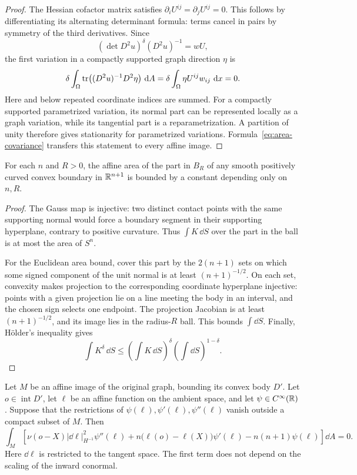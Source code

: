 \begin{proof}
The Hessian cofactor matrix satisfies
\(\partial_iU^{ij}=\partial_jU^{ij}=0\). This follows by differentiating
its alternating determinant formula: terms cancel in pairs by symmetry
of the third derivatives. Since
\[
 (\det D^2u)^\delta(D^2u)^{-1}=wU,
\]
the first variation in a compactly supported graph direction \(\eta\)
is
\[
 \delta\int_\Omega
 \operatorname{tr}\bigl((D^2u)^{-1}D^2\eta\bigr)\,\mathop{}\!\mathrm d A
 =\delta\int_\Omega \eta U^{ij}w_{ij}\,\mathop{}\!\mathrm d x=0.
\]
Here and below repeated coordinate indices are summed. For a compactly
supported parametrized variation, its normal part can be represented
locally as a graph variation, while its tangential part is a
reparametrization. A partition of unity therefore gives stationarity
for parametrized variations. Formula~\eqref{eq:area-covariance}
transfers this statement to every affine image.
\end{proof}

\begin{lemma}\label{lem:area-bound}
For each \(n\) and \(R>0\), the affine area of the part in \(B_R\) of
any smooth positively curved convex boundary in \(\mathbb R^{n+1}\) is bounded
by a constant depending only on \(n,R\).
\end{lemma}

\begin{proof}
The Gauss map is injective: two distinct contact points with the same
supporting normal would force a boundary segment in their supporting
hyperplane, contrary to positive curvature. Thus \(\int K\,\dd S\)
over the part in the ball is at most the area of \(S^n\).

For the Euclidean area bound, cover this part by the \(2(n+1)\) sets on
which some signed component of the unit normal is at least
\((n+1)^{-1/2}\). On each set, convexity makes projection to the
corresponding coordinate hyperplane injective: points with a given
projection lie on a line meeting the body in an interval, and the
chosen sign selects one endpoint. The projection Jacobian is at
least \((n+1)^{-1/2}\), and its image lies in the radius-\(R\) ball.
This bounds \(\int\dd S\). Finally, H\"older's inequality gives
\[
 \int K^\delta\,\dd S
 \le \left(\int K\,\dd S\right)^\delta
      \left(\int\dd S\right)^{1-\delta}.
\]
\end{proof}

\begin{lemma}\label{lem:cap-identity}
Let \(M\) be an affine image of the original graph, bounding its
convex body \(D'\). Let \(o\in\operatorname{int}D'\), let \(\ell\)
be an affine function on the ambient space, and let
\(\psi\in C^\infty(\mathbb R)\). Suppose that the restrictions of
\(\psi(\ell),\psi'(\ell),\psi''(\ell)\) vanish outside a compact
subset of \(M\). Then
\begin{equation}\label{eq:cap-identity}
 \int_M\left[
  \nu(o-X)|\dd\ell|_{H^{-1}}^2\psi''(\ell)
  +n\bigl(\ell(o)-\ell(X)\bigr)\psi'(\ell)
  -n(n+1)\psi(\ell)
 \right]\dd A=0.
\end{equation}
Here \(\dd\ell\) is restricted to the tangent space. The first term
does not depend on the scaling of the inward conormal.
\end{lemma}

